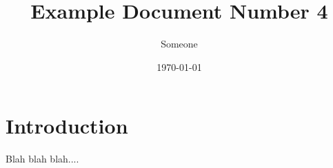 \documentclass[11pt]{article}
\title{Example Document Number 4}
\author{Someone}
\date{\today}
\begin{document}
\maketitle
\section{Introduction}
Blah blah blah....

\nocite{*}


\end{document}

